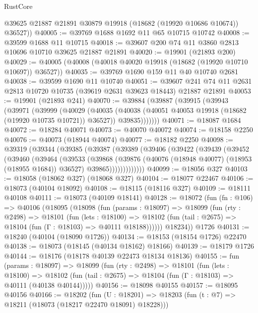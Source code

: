 \begin{lexlean}{RustCore}
\begin{coremodule}
        @39625
        @21887
        @21891
        @30879
        @19918
        (@18682 (@19920 @10686 @10674))
        @36527))
@40005 := @39769 @1688 @1692 @11 @65 @10715 @10742
@40008 := @39599 @1688 @11 @10715
@40018 := @39607 @200 @74 @11 @3860 @2813 @10696 @10710 @39625 @21887 @21891
@40020 := @19901 (@21893 @200)
@40029 := @40005 (@40008 (@40018 @40020 @19918 (@18682 (@19920 @10710 @10697)) @36527))
@40035 := @39769 @1690 @159 @11 @40 @10740 @2681
@40038 := @39599 @1690 @11 @10740
@40051 := @39607 @241 @74 @11 @2631 @2813 @10720 @10735 (@39619 @2631 @39623 @18443) @21887 @21891
@40053 := @19901 (@21893 @241)
@40070 := @39884
    (@39887
      (@39915
        (@39943
          (@39971
            (@39999
              (@40029
                (@40035
                  (@40038 (@40051 @40053 @19918 (@18682 (@19920 @10735 @10721)) @36527))
                  @39835)))))))
@40071 := @18087 @1684
@40072 := @18284 @40071
@40073 := @40070 @40072
@40074 := @18158 @2250
@40076 := @40073 (@18944 @40074)
@40077 := @18182 @2250
@40098 := @39319
    (@39344
      (@39385
        (@39387
          (@39389
            (@39406
              (@39422
                (@39439
                  (@39452
                    (@39460
                      (@39464
                        (@39533
                          (@39868
                            (@39876
                              (@40076 (@18948 @40077) (@18953 (@18955 @1684)) @36527)
                              @39865)))))))))))))
@40099 := @18056 @327
@40103 := @18058 (@18062 @327) (@18068 @327)
@40104 := @18077 @22467
@40106 := @18073 (@40104 @18092)
@40108 := @18115 (@18116 @327)
@40109 := @18111 @40108
@40111 := @18073 (@40109 @18141)
@40128 := @18072
    (fun (fn : @106) =>
    @40106
      (@18095
        (@18098
          (fun (params : @18097) =>
          @18099
            (fun (rty : @2498) =>
            @18101
              (fun (lets : @18100) =>
              @18102 (fun (tail : @2675) => @18104 (fun (Γ : @18103) => @40111 @18188))))))
        @18234))
    @1726
@40131 := @18240 (@40104 (@18090 @1726))
@40134 := @18153 (@18154 @1726) @22470
@40138 := @18073 (@18145 (@40134 @18162) @18166)
@40139 := @18179 @1726
@40144 := @18176 (@18178 @40139 @22473 @18134 @18136)
@40155 := fun (params : @18097) =>
  @18099
    (fun (rty : @2498) =>
    @18101
      (fun (lets : @18100) =>
      @18102 (fun (tail : @2675) => @18104 (fun (Γ : @18103) => @40111 (@40138 @40144)))))
@40156 := @18098 @40155
@40157 := @18095 @40156
@40166 := @18202
    (fun (U : @18201) => @18203 (fun (t : @7) => @18211 (@18073 (@18217 @22470 @18091) @18228)))

\end{coremodule}
\end{lexlean}
